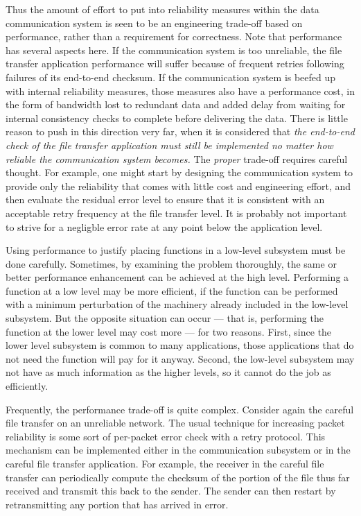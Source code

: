 \documentclass[a4paper,12pt,notitlepage,twoside,openright]{article}
\begin{document}
Thus the amount of effort to put into reliability measures within the
data communication system is seen to be an engineering trade-off based
on performance, rather than a requirement for correctness. Note that
performance has several aspects here. If the communication system is too
unreliable, the file transfer application performance will suffer
because of frequent retries following failures of its end-to-end
checksum. If the communication system is beefed up with internal
reliability measures, those measures also have a performance cost, in
the form of bandwidth lost to redundant data and added delay from
waiting for internal consistency checks to complete before delivering
the data. There is little reason to push in this direction very far,
when it is considered that \emph{the end-to-end check of the file
transfer application must still be implemented no matter how reliable
the communication system becomes.} The \emph{proper} trade-off requires
careful thought. For example, one might start by designing the
communication system to provide only the reliability that comes with
little cost and engineering effort, and then evaluate the residual error
level to ensure that it is consistent with an acceptable retry frequency
at the file transfer level. It is probably not important to strive for a
negligble error rate at any point below the application level.


Using performance to justify placing functions in a low-level subsystem
must be done carefully. Sometimes, by examining the problem thoroughly,
the same or better performance enhancement can be achieved at the high
level. Performing a function at a low level may be more efficient, if
the function can be performed with a minimum perturbation of the
machinery already included in the low-level subsystem. But the opposite
situation can occur --- that is, performing the function at the lower
level may cost more --- for two reasons. First, since the lower level
subsystem is common to many applications, those applications that do not
need the function will pay for it anyway. Second, the low-level
subsystem may not have as much information as the higher levels, so it
cannot do the job as efficiently.

Frequently, the performance trade-off is quite complex. Consider again
the careful file transfer on an unreliable network. The usual technique
for increasing packet reliability is some sort of per-packet error check
with a retry protocol. This mechanism can be implemented either in the
communication subsystem or in the careful file transfer application. For
example, the receiver in the careful file transfer can periodically
compute the checksum of the portion of the file thus far received and
transmit this back to the sender. The sender can then restart by
retransmitting any portion that has arrived in error.
\end{document}

